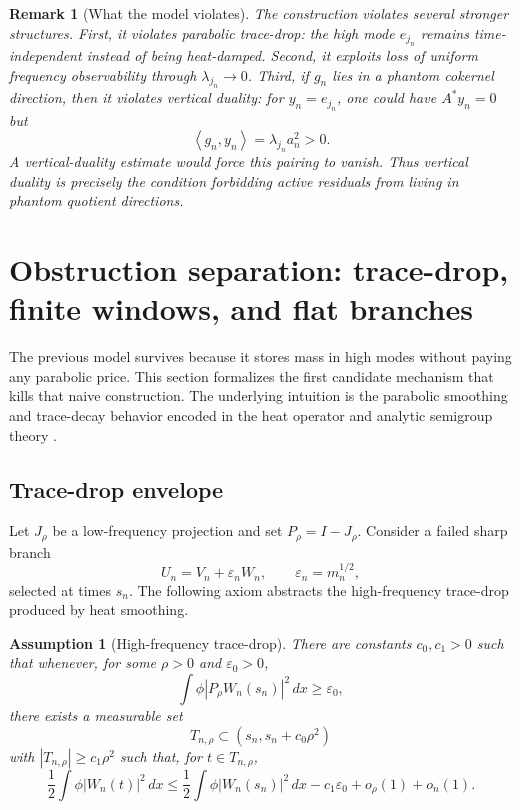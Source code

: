 \documentclass[11pt]{article}
\numberwithin{equation}{section}
\newtheorem{assumption}[theorem]{Assumption}
\newtheorem{remark}[theorem]{Remark}
\newcommand{\eps}{\varepsilon}
\newcommand{\dx}{\,dx}
\newcommand{\ip}[2]{\left\langle #1,#2\right\rangle}
\begin{document}
\begin{remark}[What the model violates]
The construction violates several stronger structures.  First, it violates parabolic trace-drop: the high mode \(e_{j_n}\) remains time-independent instead of being heat-damped.  Second, it exploits loss of uniform frequency observability through \(\lambda_{j_n}\to0\).  Third, if \(g_n\) lies in a phantom cokernel direction, then it violates vertical duality: for \(y_n=e_{j_n}\), one could have \(A^*y_n=0\) but
\[
\ip{g_n}{y_n}=\lambda_{j_n}a_n^2>0.
\]
A vertical-duality estimate would force this pairing to vanish.  Thus vertical duality is precisely the condition forbidding active residuals from living in phantom quotient directions.
\end{remark}

\section{Obstruction separation: trace-drop, finite windows, and flat branches}

\label{sec:trace-drop-test}

The previous model survives because it stores mass in high modes without paying any parabolic price.  This section formalizes the first candidate mechanism that kills that naive construction.  The underlying intuition is the parabolic smoothing and trace-decay behavior encoded in the heat operator and analytic semigroup theory \cite{Amann1995,Lunardi1995}.

\subsection{Trace-drop envelope}

Let \(J_\rho\) be a low-frequency projection and set \(P_\rho=I-J_\rho\).  Consider a failed sharp branch
\[
U_n=V_n+\eps_nW_n,
\qquad
\eps_n=m_n^{1/2},
\]
selected at times \(s_n\).  The following axiom abstracts the high-frequency trace-drop produced by heat smoothing.

\begin{assumption}[High-frequency trace-drop]\label{ass:TD}
There are constants \(c_0,c_1>0\) such that whenever, for some \(\rho>0\) and \(\varepsilon_0>0\),
\begin{equation}\label{eq:hf-tail-lower}
\int \phi |P_\rho W_n(s_n)|^2\dx\ge \varepsilon_0,
\end{equation}
there exists a measurable set
\[
T_{n,\rho}\subset (s_n,s_n+c_0\rho^2)
\]
with \(|T_{n,\rho}|\ge c_1\rho^2\) such that, for \(t\in T_{n,\rho}\),
\begin{equation}\label{eq:TD-drop-W}
\frac12\int\phi|W_n(t)|^2\dx
\le
\frac12\int\phi|W_n(s_n)|^2\dx
-c_1\varepsilon_0+o_\rho(1)+o_n(1).
\end{equation}
\end{assumption}
\end{document}
